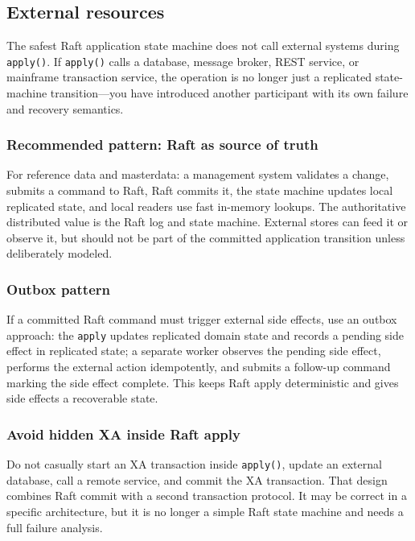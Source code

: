 \subsection{External resources}

The safest Raft application state machine does not call external systems
during \texttt{apply()}. If \texttt{apply()} calls a database, message
broker, REST service, or mainframe transaction service, the operation is
no longer just a replicated state-machine transition---you have introduced
another participant with its own failure and recovery semantics.

\subsubsection{Recommended pattern: Raft as source of truth}

For reference data and masterdata: a management system validates a change,
submits a command to Raft, Raft commits it, the state machine updates
local replicated state, and local readers use fast in-memory lookups.
The authoritative distributed value is the Raft log and state machine.
External stores can feed it or observe it, but should not be part of the
committed application transition unless deliberately modeled.

\subsubsection{Outbox pattern}

If a committed Raft command must trigger external side effects, use an
outbox approach: the \texttt{apply} updates replicated domain state and
records a pending side effect in replicated state; a separate worker
observes the pending side effect, performs the external action
idempotently, and submits a follow-up command marking the side effect
complete. This keeps Raft apply deterministic and gives side effects a
recoverable state.

\subsubsection{Avoid hidden XA inside Raft apply}

Do not casually start an XA transaction inside \texttt{apply()}, update
an external database, call a remote service, and commit the XA
transaction. That design combines Raft commit with a second transaction
protocol. It may be correct in a specific architecture, but it is no
longer a simple Raft state machine and needs a full failure analysis.


